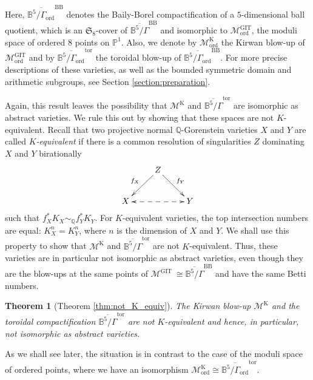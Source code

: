 \documentclass[12pt, pdftex]{amsart}
\theoremstyle{plain}
\newtheorem{thm}{Theorem}[section]
\theoremstyle{definition}
\numberwithin{equation}{section}
\def\Q{{\mathbb Q}}
\def\P{{\mathbb P}}
\def\B{{\mathbb B}}
\def\SS{{\mathfrak S}}
\def\ord{\mathrm{ord}}
\def\GIT{\mathrm{GIT}}
\def\K{\mathrm{K}}
\def\tor{\mathrm{tor}}
\def\BB{\mathrm{BB}}
\def\M{\mathcal{M}}
\begin{document}
Here, $\overline{\B^5/\Gamma_{\ord}}^{\BB}$ denotes the Baily-Borel compactification of a $5$-dimensional ball quotient, which is 
 an $\SS_8$-cover of $\overline{\B^5/\Gamma}^{\BB}$ and isomorphic to $\M^{\GIT}_{\ord}$, the moduli space of ordered 8 points on $\P^1$.
Also, we denote by $\M_{\ord}^{\K}$ the Kirwan blow-up of $\M^{\GIT}_{\ord}$ and by $\overline{\B^5/\Gamma_{\ord}}^{\tor}$ the toroidal blow-up of $\overline{\B^5/\Gamma_{\ord}}^{\BB}$.
For more precise descriptions of these varieties,  as well as the bounded symmetric domain and arithmetic subgroups, see Section \ref{section:preparation}.


Again, this result leaves the possibility that $\M^{\K}$ and $\overline{\B^5/\Gamma}^{\tor}$ are isomorphic as abstract varieties. We  rule this out by showing 
that these spaces are not $K$-equivalent. Recall that  two projective normal $\Q$-Gorenstein varieties $X$ and $Y$ are called \textit{$K$-equivalent} if there  is a common
resolution of singularities  $Z$ dominating $X$ and $Y$ birationally
\begin{equation*}\label{E:Kequiv}
\xymatrix{
&Z\ar[ld]_{f_X} \ar[rd]^{f_Y}&\\
X\ar@{<-->}[rr]&&Y
}
\end{equation*}
such that $f_X^*K_X \sim_{\Q} f_Y^*K_Y$. 
For $K$-equivalent varieties, the top intersection numbers are equal: $K_X^n=K_Y^n$, where $n$ is the dimension of $X$ and $Y$. We shall use this property to show that 
$\M^{\K}$ and $\overline{\B^5/\Gamma}^{\tor}$ are not $K$-equivalent.  
Thus, these varieties are in particular not isomorphic as abstract varieties,  even though they are the blow-ups at the same points of $\M^{\GIT}\ \cong \overline{\B^5/\Gamma}^{\BB}$ and 
have the same Betti numbers.

\begin{thm}[{Theorem \ref{thm:not_K_equiv}}]
\label{mainthm:not_K_equiv}
The Kirwan blow-up $\M^{\K}$ and the toroidal compactification $\overline{\B^5/\Gamma}^{\tor}$ are not $K$-equivalent and hence, in particular, not isomorphic as abstract varieties.
\end{thm}

 As we shall see later, the situation is in contrast to the case of the moduli space of ordered points, where we have an isomorphism 
$\M_{\ord}^{\K} \cong \overline{\B^5/\Gamma_{\ord}}^{\tor}$.
\end{document}
